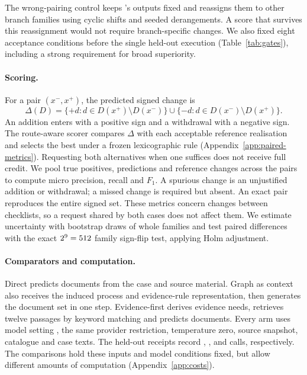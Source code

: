 The wrong-pairing control keeps \casepath's outputs fixed and reassigns them
to other branch families using \wpShifts{} cyclic shifts and \wpDraws{}
seeded derangements. A score that survives this reassignment would not
require branch-specific changes. We also fixed eight acceptance conditions
before the single held-out execution (Table~\ref{tab:gates}), including a
strong requirement for broad superiority.

\paragraph{Scoring.}
For a pair $(x^-,x^+)$, the predicted signed change is
\begin{equation}
\Delta(D)=\{+d:d\in D(x^+)\setminus D(x^-)\}\cup\{-d:d\in D(x^-)\setminus D(x^+)\}.
\label{eq:delta}
\end{equation}
An addition enters with a positive sign and a withdrawal with a negative
sign. The route-aware scorer compares $\Delta$ with each acceptable
reference realisation and selects the best under a frozen lexicographic
rule (Appendix~\ref{app:paired-metrics}). Requesting both alternatives
when one suffices does not receive full credit. We pool true positives,
predictions and reference changes across the \nPairsHid{} pairs to compute
micro precision, recall and $F_1$. A spurious change is an unjustified
addition or withdrawal; a missed change is required but absent. An exact
pair reproduces the entire signed set. These metrics concern changes
between checklists, so a request shared by both cases does not affect them.
We estimate uncertainty with \bootDraws{} bootstrap draws of whole
families and test paired differences with the exact $2^9=512$
family sign-flip test, applying Holm adjustment.

\paragraph{Comparators and computation.}
Direct predicts documents from the case and source material. Graph as
context also receives the induced process and evidence-rule representation,
then generates the document set in one step. Evidence-first derives
evidence needs, retrieves twelve passages by keyword matching and predicts
documents. Every arm uses model setting \texttt{\cpModel}, the same provider
restriction, temperature zero, source snapshot, catalogue and case texts.
The held-out receipts record \dirCalls, \gcCalls, \efCalls{} and \cpCalls{}
calls, respectively. The comparisons hold these inputs and model conditions
fixed, but allow different amounts of computation (Appendix~\ref{app:costs}).
